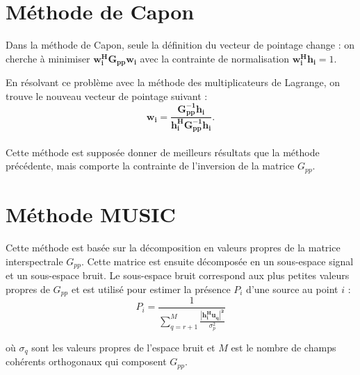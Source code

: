 \documentclass[a4paper]{article}
\renewcommand{\b}[1]{\boldsymbol{#1}}
\begin{document}
\section{Méthode de Capon}

Dans la méthode de Capon, seule la définition du vecteur de pointage change : on cherche à minimiser $\b{w_{i}^{H}G_{pp}w_{i}}$ avec la contrainte de normalisation $\b{w_{i}^{H}h_i}=1$. 

En résolvant ce problème avec la méthode des multiplicateurs de Lagrange, on trouve le nouveau vecteur de pointage suivant : $$\b{w_i=\frac{G_{pp}^{-1}h_{i}}{h_{i}^{H}G_{pp}^{-1}h_{i}}}.$$\\

Cette méthode est supposée donner de meilleurs résultats que la méthode précédente, mais comporte la contrainte de l'inversion de la matrice $G_{pp}$.

\section{Méthode MUSIC}

Cette méthode est basée sur la décomposition en valeurs propres de la matrice interspectrale $G_{pp}$. Cette matrice est ensuite décomposée en un sous-espace signal et un sous-espace bruit. Le sous-espace bruit correspond aux plus petites valeurs propres de $G_{pp}$ et est utilisé pour estimer la présence $P_i$ d'une source au point $i$ :
 \begin{equation}
 P_i = \frac{1}{\sum \limits_{q=r+1}^{M} \frac{\b{\left|h_{i}^{H}u_q\right|^{2}}}{\sigma_{p}^{2}}}
\end{equation}

où $\sigma_q$ sont les valeurs propres de l'espace bruit et $M$ est le nombre de champs cohérents orthogonaux qui composent $G_{pp}$.
\end{document}

